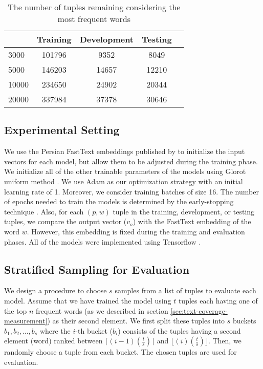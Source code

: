 \documentclass{article}
\begin{document}
\begin{table}
	\centering
	\begin{tabular}{l|*{4}{c}}
		\toprule
		\diagbox{\# Words}{\# Samples} & Training & Development & Testing \\\hline
		\midrule
		3000 & 101796 & 9352 & 8049  \\\hline
		5000 & 146203 & 14657 & 12210  \\\hline
		10000 & 234650 & 24902 & 20344  \\\hline
		20000 & 337984 & 37378 & 30646  \\\hline
		\bottomrule
	\end{tabular}%
	\caption{The number of tuples remaining considering the most frequent words}
	\label{tab:tr-de-te}
\end{table}%

\subsection{Experimental Setting}
We use the Persian FastText embeddings published by \citet{grave2018learning} to initialize the input vectors for each model, but allow them to be adjusted during the training phase. We initialize all of the other trainable parameters of the models using Glorot uniform method \citep{glorot2010understanding}. We use Adam \citep{kingma2014adam} as our optimization strategy with an initial learning rate of 1. Moreover, we consider training batches of size 16. The number of epochs needed to train the models is determined by the early-stopping technique \citep{prechelt1998early}. Also, for each $(p,w)$ tuple in the training, development, or testing tuples, we compare the output vector ($v_o$) with the FastText embedding of the word $w$. However, this embedding is fixed during the training and evaluation phases. All of the models were implemented using Tensorflow \cite{abadi2016tensorflow}.
\subsection{Stratified Sampling for Evaluation}
We design a procedure to choose $s$ samples from a list of tuples to evaluate each model. Assume that we have trained the model using $t$ tuples each having one of the top $n$ frequent words (as we described in section \ref{sec:text-coverage-measurement}) as their second element. We first split these tuples into $s$ buckets $b_1, b_2, \dots, b_s$ where the $i$-th bucket ($b_i$) consists of the tuples having a second element (word) ranked between $\lceil(i-1)(\frac{t}{s})\rceil$ and $\lfloor(i)(\frac{t}{s})\rfloor$. Then, we randomly choose a tuple from each bucket. The chosen tuples are used for evaluation.
\end{document}
